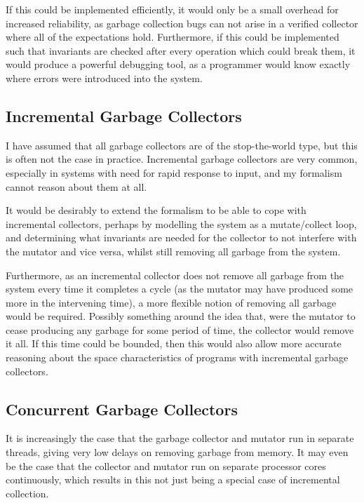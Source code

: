 If this could be implemented efficiently, it would only be a small
overhead for increased reliability, as garbage collection bugs can not
arise in a verified collector where all of the expectations
hold. Furthermore, if this could be implemented such that invariants
are checked after every operation which could break them, it would
produce a powerful debugging tool, as a programmer would know exactly
where errors were introduced into the system.

\subsection{Incremental Garbage Collectors}
\label{sec:conclusion-further-incremental}

I have assumed that all garbage collectors are of the stop-the-world
type, but this is often not the case in practice. Incremental garbage
collectors are very common, especially in systems with need for rapid
response to input, and my formalism cannot reason about them at
all.

It would be desirably to extend the formalism to be able to cope with
incremental collectors, perhaps by modelling the system as a
mutate/collect loop, and determining what invariants are needed for
the collector to not interfere with the mutator and vice versa, whilst
still removing all garbage from the system.

Furthermore, as an incremental collector does not remove all garbage
from the system every time it completes a cycle (as the mutator may
have produced some more in the intervening time), a more flexible
notion of removing all garbage would be required. Possibly something
around the idea that, were the mutator to cease producing any garbage
for some period of time, the collector would remove it all. If this
time could be bounded, then this would also allow more accurate
reasoning about the space characteristics of programs with incremental
garbage collectors.

\subsection{Concurrent Garbage Collectors}
\label{sec:conclusion-further-concurrent}

It is increasingly the case that the garbage collector and mutator run
in separate threads, giving very low delays on removing garbage from
memory. It may even be the case that the collector and mutator run on
separate processor cores continuously, which results in this not just
being a special case of incremental collection.

